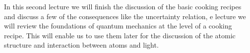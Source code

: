 In this second lecture we will finish the discussion of the basic cooking recipes and discuss a few of the consequences like the uncertainty relation, e lecture we will review the foundations of quantum mechanics at the level of a cooking recipe. This will enable us to use them later for the discussion of the atomic structure and interaction between atoms and light.